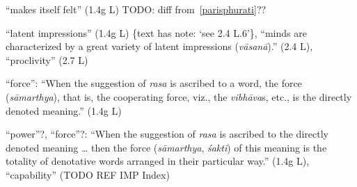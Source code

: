 \documentclass[10pt]{article}
\begin{document}
\begin{multicols}{2}
\begin{enumerate}[
			leftmargin=0em,
			rightmargin=0em,
		]
		 ``makes itself felt'' (1.4g L) TODO: diff from~\ref{parisphurati}??

		 ``latent impressions'' (1.4g L) \{text has note: `see 2.4 L.6'\},
		``minds are characterized by a great variety of latent impressions (\textit{vāsanā}).'' (2.4 L),
		``proclivity'' (2.7 L)

		 ``force'': ``When the suggestion of \textit{rasa} is ascribed to a word, the force (\textit{sāmarthya}), that is, the cooperating force, viz., the \textit{vibhāva}s, etc., is the directly denoted meaning.'' (1.4g L)

		 ``power''?, ``force''?: ``When the suggestion of \textit{rasa} is ascribed to the directly denoted meaning \dots
		then the force (\textit{sāmarthya}, \textit{śakti}) of this meaning is the totality of denotative words arranged in their particular way.'' (1.4g L),
		``capability'' (TODO REF IMP Index)


\end{enumerate}
\end{multicols}
\end{document}
